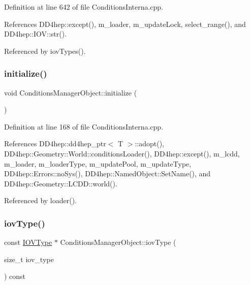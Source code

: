 Definition at line 642 of file Conditions\+Interna.\+cpp.



References D\+D4hep\+::except(), m\+\_\+loader, m\+\_\+update\+Lock, select\+\_\+range(), and D\+D4hep\+::\+I\+O\+V\+::str().



Referenced by iov\+Types().

\hypertarget{class_d_d4hep_1_1_conditions_1_1_conditions_manager_object_a598756c7672c67065f3d116689f95722}{}\label{class_d_d4hep_1_1_conditions_1_1_conditions_manager_object_a598756c7672c67065f3d116689f95722} 
\subsubsection{\texorpdfstring{initialize()}{initialize()}}
{\footnotesize\ttfamily void Conditions\+Manager\+Object\+::initialize (\begin{DoxyParamCaption}{ }\end{DoxyParamCaption})}



Definition at line 168 of file Conditions\+Interna.\+cpp.



References D\+D4hep\+::dd4hep\+\_\+ptr$<$ T $>$\+::adopt(), D\+D4hep\+::\+Geometry\+::\+World\+::conditions\+Loader(), D\+D4hep\+::except(), m\+\_\+lcdd, m\+\_\+loader, m\+\_\+loader\+Type, m\+\_\+update\+Pool, m\+\_\+update\+Type, D\+D4hep\+::\+Errors\+::no\+Sys(), D\+D4hep\+::\+Named\+Object\+::\+Set\+Name(), and D\+D4hep\+::\+Geometry\+::\+L\+C\+D\+D\+::world().



Referenced by loader().

\hypertarget{class_d_d4hep_1_1_conditions_1_1_conditions_manager_object_a5dd9771697550f7f82d47863026d4bd5}{}\label{class_d_d4hep_1_1_conditions_1_1_conditions_manager_object_a5dd9771697550f7f82d47863026d4bd5} 
\subsubsection{\texorpdfstring{iov\+Type()}{iovType()}\hspace{0.1cm}{\footnotesize\ttfamily [1/2]}}
{\footnotesize\ttfamily const \hyperlink{class_d_d4hep_1_1_i_o_v_type}{I\+O\+V\+Type} $\ast$ Conditions\+Manager\+Object\+::iov\+Type (\begin{DoxyParamCaption}\item[{size\+\_\+t}]{iov\+\_\+type }\end{DoxyParamCaption}) const}



